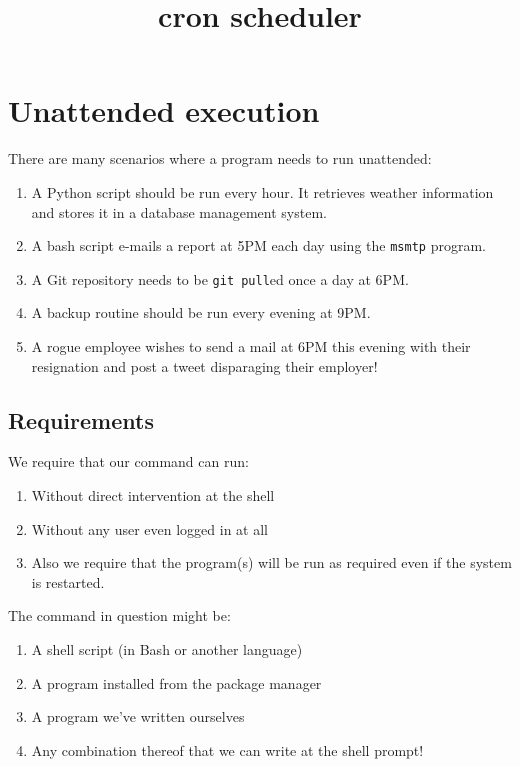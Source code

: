 \documentclass[slides]{pgnotes}
\title{cron scheduler}
\begin{document}
\maketitle

\tableofcontents

\section{Unattended execution}

There are many scenarios where a program needs to run unattended:

\begin{enumerate}
  
\item A Python script should be run every hour.
  It retrieves weather information and stores it in a database management system.

\item A bash script e-mails a report at 5PM each day using the \texttt{msmtp} program.

\item A Git repository needs to be \texttt{git pull}ed once a day at 6PM. 
  
\item A backup routine should be run every evening at 9PM.
  
\item A rogue employee wishes to send a mail at 6PM this evening with their resignation and post a tweet disparaging their employer!
  
\end{enumerate}


\subsection{Requirements}

We require that our command can run:
\begin{enumerate}
\item Without direct intervention at the shell
\item Without any user even logged in at all
\item Also we require that the program(s) will be run as required even if the system is restarted.   
\end{enumerate}

The command in question might be: 
\begin{enumerate}
\item A shell script (in Bash or another language)
\item A program installed from the package manager
\item A program we've written ourselves
\item Any combination thereof that we can write at the shell prompt!
\end{enumerate}
\end{document}
